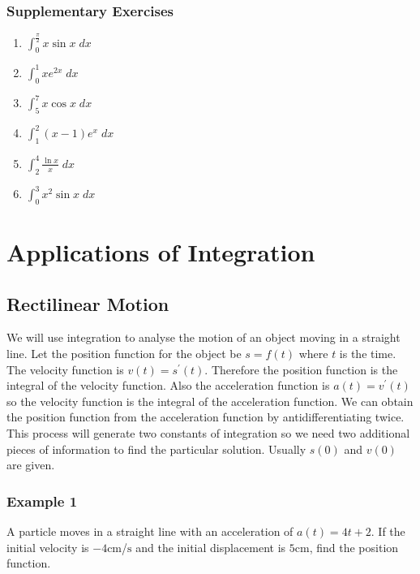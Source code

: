 \subsubsection{Supplementary Exercises}
\begin{enumerate}
\item $\int _{0}^{\frac{\pi }{2}}x \sin  x\; d x$ 

\item $\int _{0}^{1}x e^{2 x}\; d x$ 

\item $\int _{5}^{7}x \cos  x\; d x$ 

\item $\int _{1}^{2}\left (x -1\right ) e^{x}\; d x$ 

\item $\int _{2}^{4}\frac{\ln  x}{x}\; d x$ 

\item $\int _{0}^{3}x^{2} \sin  x\; d x$ \end{enumerate}


 

\section{Applications of Integration}


\subsection{Rectilinear Motion}
We will use integration to analyse the motion of an object moving in a straight line. Let
the position function for the object be $s =f (t)$ where $t$ is the time. The velocity function is $v (t) =s^{ \prime } (t)$. Therefore the position function is the integral of the velocity function. Also
the acceleration function is $a (t) =v^{ \prime } (t)$ so the velocity function is the integral of the acceleration function. We can obtain
the position function from the acceleration function by antidifferentiating twice. This process will generate
two constants of integration so we need two additional pieces of information to find the particular solution. Usually
$s (0)$ and $v (0)$ are given. 

\subsubsection{Example 1}
A particle moves in a straight line with an acceleration of $a (t) =4 t +2$. If the initial velocity is $ -4 \mbox{cm}$/$\mbox{s}$ and the initial displacement is $5 \mbox{cm}$, find the position function. 

